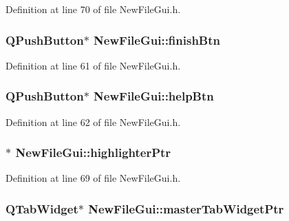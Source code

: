 Definition at line 70 of file New\-File\-Gui.\-h.

\hypertarget{class_new_file_gui_a9caaf4a098bc03388235461844770705}{
\subsubsection[{finish\-Btn}]{\setlength{\rightskip}{0pt plus 5cm}Q\-Push\-Button$\ast$ New\-File\-Gui\-::finish\-Btn\hspace{0.3cm}{\ttfamily [private]}}}\label{class_new_file_gui_a9caaf4a098bc03388235461844770705}


Definition at line 61 of file New\-File\-Gui.\-h.

\hypertarget{class_new_file_gui_a3a59cd57999cc1004a95ab2fbb3e6766}{
\subsubsection[{help\-Btn}]{\setlength{\rightskip}{0pt plus 5cm}Q\-Push\-Button$\ast$ New\-File\-Gui\-::help\-Btn\hspace{0.3cm}{\ttfamily [private]}}}\label{class_new_file_gui_a3a59cd57999cc1004a95ab2fbb3e6766}


Definition at line 62 of file New\-File\-Gui.\-h.

\hypertarget{class_new_file_gui_a4a63ed16985eeb14fbe35e3197420873}{
\subsubsection[{highlighter\-Ptr}]{$\ast$ New\-File\-Gui\-::highlighter\-Ptr\hspace{0.3cm}{\ttfamily [private]}}}\label{class_new_file_gui_a4a63ed16985eeb14fbe35e3197420873}


Definition at line 69 of file New\-File\-Gui.\-h.

\hypertarget{class_new_file_gui_a9a3baa00763c6d8d90e7e39ea3f1585c}{
\subsubsection[{master\-Tab\-Widget\-Ptr}]{\setlength{\rightskip}{0pt plus 5cm}Q\-Tab\-Widget$\ast$ New\-File\-Gui\-::master\-Tab\-Widget\-Ptr\hspace{0.3cm}{\ttfamily [private]}}}\label{class_new_file_gui_a9a3baa00763c6d8d90e7e39ea3f1585c}


